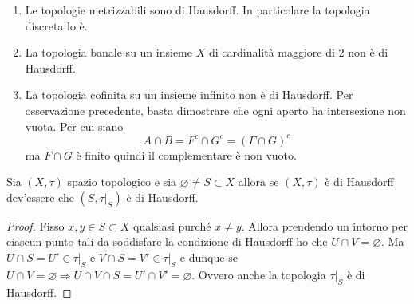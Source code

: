 \begin{example}
\begin{enumerate}
	\item Le topologie metrizzabili sono di Hausdorff. In particolare la topologia discreta lo è. 
	\item La topologia banale su un insieme $X$ di cardinalità maggiore di $2$ non è di Hausdorff. 
	\item La topologia cofinita su un insieme infinito non è di Hausdorff. Per osservazione precedente, basta dimostrare che ogni aperto ha intersezione non vuota. Per cui siano 
	\begin{equation*}
	A \cap B = F^c \cap G^c = (F \cap G)^c 
	\end{equation*}
	ma $F\cap G$ è finito quindi il complementare è non vuoto. 
\end{enumerate}
\end{example}

\begin{theorem}
	Sia $(X, \tau)$ spazio topologico e sia $\varnothing \neq S \subset X$ allora se $(X, \tau)$ è di Hausdorff dev'essere che $(S, \tau|_S)$ è di Hausdorff. 
\end{theorem} 
\begin{proof}
	Fisso $x,y \in S \subset X$ qualsiasi purché $x \neq y$. Allora prendendo un intorno per ciascun punto tali da soddisfare la condizione di Hausdorff ho che $U \cap V = \varnothing$. Ma $U \cap S = U' \in \tau|_S$ e $V \cap S = V' \in \tau|_S$ e dunque se $U \cap V = \varnothing \Longrightarrow U \cap V \cap S = U' \cap V' = \varnothing$. Ovvero anche la topologia $\tau|_S$ è di Hausdorff.
\end{proof}

